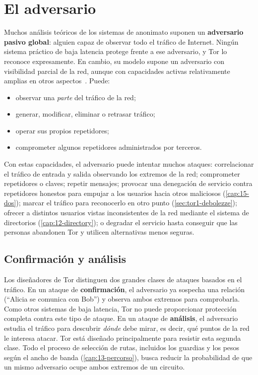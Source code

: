 \section{El adversario}\label{sec:minaccia-avversario}

Muchos análisis teóricos de los sistemas de anonimato suponen un \textbf{adversario pasivo global}: alguien capaz de observar todo el tráfico de Internet. Ningún sistema práctico de baja latencia protege frente a ese adversario, y Tor lo reconoce expresamente. En cambio, su modelo supone un adversario con visibilidad parcial de la red, aunque con capacidades activas relativamente amplias en otros aspectos~\cite{dingledine2004tor}. Puede:
\begin{itemize}
  \item observar una \emph{parte} del tráfico de la red;
  \item generar, modificar, eliminar o retrasar tráfico;
  \item operar sus propios repetidores;
  \item comprometer algunos repetidores administrados por terceros.
\end{itemize}

Con estas capacidades, el adversario puede intentar muchos ataques: correlacionar el tráfico de entrada y salida observando los extremos de la red; comprometer repetidores o claves; repetir mensajes; provocar una denegación de servicio contra repetidores honestos para empujar a los usuarios hacia otros maliciosos (\cref{cap:15-dos}); marcar el tráfico para reconocerlo en otro punto (\cref{sec:tor1-debolezze}); ofrecer a distintos usuarios vistas inconsistentes de la red mediante el sistema de directorios (\cref{cap:12-directory}); o degradar el servicio hasta conseguir que las personas abandonen Tor y utilicen alternativas menos seguras.

\subsection{Confirmación y análisis}

Los diseñadores de Tor distinguen dos grandes clases de ataques basados en el tráfico. En un ataque de \textbf{confirmación}, el adversario ya sospecha una relación (\enquote{Alicia se comunica con Bob}) y observa ambos extremos para comprobarla. Como otros sistemas de baja latencia, Tor no puede proporcionar protección completa contra este tipo de ataque. En un ataque de \textbf{análisis}, el adversario estudia el tráfico para descubrir \emph{dónde} debe mirar, es decir, qué puntos de la red le interesa atacar. Tor está diseñado principalmente para resistir esta segunda clase. Todo el proceso de selección de rutas, incluidos los guardias y los pesos según el ancho de banda (\cref{cap:13-percorso}), busca reducir la probabilidad de que un mismo adversario ocupe ambos extremos de un circuito.

